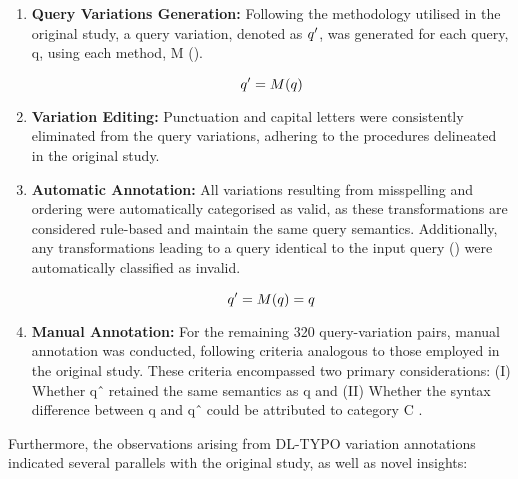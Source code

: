 \begin{enumerate}
\item \textbf{Query Variations Generation:} Following the methodology utilised in the original study, a query variation, denoted as $q\sp{\prime}$, was generated for each query, q, using each method, M ().

\begin{equation}\label{eq1}
    q\sp{\prime} = M(q)
\end{equation}

\item \textbf{Variation Editing:} Punctuation and capital letters were consistently eliminated from the query variations, adhering to the procedures delineated in the original study.
\item \textbf{Automatic Annotation:} All variations resulting from misspelling and ordering were automatically categorised as valid, as these transformations are considered rule-based and maintain the same query semantics. Additionally, any transformations leading to a query identical to the input query () were automatically classified as invalid.

\begin{equation}\label{eq2}
    q\sp{\prime} = M(q) = q
\end{equation}

\item \textbf{Manual Annotation:} For the remaining 320 query-variation pairs, manual annotation was conducted, following criteria analogous to those employed in the original study. These criteria encompassed two primary considerations: (I) Whether qˆ retained the same semantics as q and (II) Whether the syntax difference between q and qˆ could be attributed to category C \cite{penha2022}.
\end{enumerate}

Furthermore, the observations arising from DL-TYPO variation annotations indicated several parallels with the original study, as well as novel insights:

